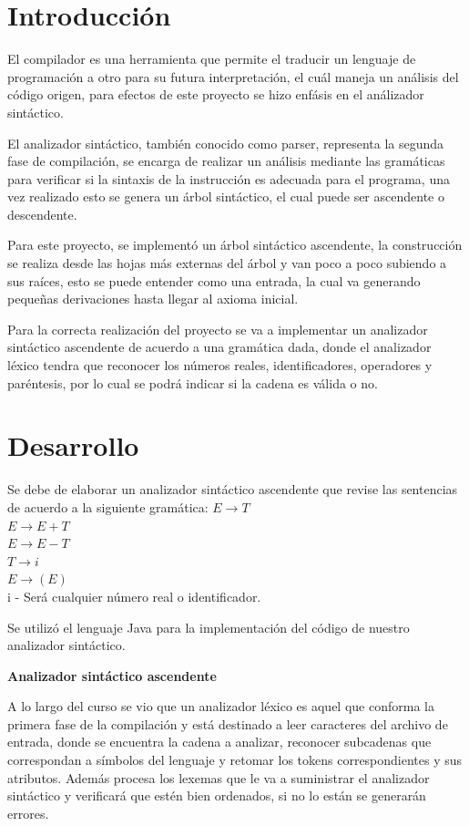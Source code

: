 \documentclass[letterpaper]{article}
\begin{document}
\tableofcontents

\newpage

\section{Introducción}
El compilador es una herramienta que permite el traducir un lenguaje de programación a otro
para su futura interpretación, el cuál maneja un análisis del código origen, para efectos de este
proyecto se hizo enfásis en el análizador sintáctico.

El analizador sintáctico, también conocido como parser, representa la segunda
fase de compilación, se encarga de realizar un análisis mediante las
gramáticas para verificar si la sintaxis de la instrucción es adecuada para el programa, una
vez realizado esto se genera un árbol sintáctico, el cual puede ser ascendente o descendente. 

Para este proyecto, se implementó un árbol sintáctico ascendente, la construcción se
realiza desde las hojas más externas del árbol y van poco a poco subiendo a sus raíces, esto
se puede entender como una entrada, la cual va generando pequeñas derivaciones hasta
llegar al axioma inicial.

Para la correcta realización del proyecto se va a implementar un analizador sintáctico
ascendente de acuerdo a una gramática dada, donde el analizador léxico tendra que reconocer
los números reales, identificadores, operadores y paréntesis, por lo cual se podrá indicar
si la cadena es válida o no.


\section{Desarrollo}
Se debe de elaborar un analizador sintáctico ascendente que revise las sentencias
de acuerdo a la siguiente gramática:
$E \rightarrow T$ \\
$E \rightarrow E + T$ \\
$E \rightarrow E - T$ \\
$T \rightarrow i$ \\
$E \rightarrow (E)$ \\
i - Será cualquier número real o identificador.

Se utilizó el lenguaje Java para la implementación del código de nuestro analizador sintáctico.

\textbf{Analizador sintáctico ascendente}

A lo largo del curso se vio que un analizador léxico es aquel que conforma la primera fase
de la compilación  y está destinado a leer caracteres del archivo de entrada, donde se
encuentra la cadena a analizar, reconocer subcadenas que correspondan a símbolos del lenguaje
y retomar los tokens correspondientes y sus atributos. Además procesa los lexemas que le va a 
suministrar el analizador sintáctico y verificará que estén bien ordenados, si no lo están
se generarán errores.
\end{document}
